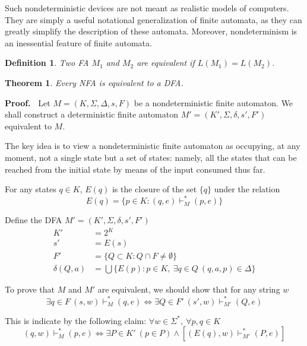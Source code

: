 \documentclass[aps,pra,onecolumn,notitlepage,superscriptaddress]{revtex4-1}
\def\y{\vdash}
\def\ys{\vdash^*}
\newtheorem{theo}{Theorem}
\newtheorem{defi}{Definition}
\def\Proof{{\bf Proof.~}}
\begin{document}
    Such nondeterministic devices are not meant as realistic models of computers. They are simply a useful notational generalization of finite automata, as they can greatly simplify the description of these automata. Moreover, nondeterminism is an inessential feature of finite automata.

    \begin{defi}
        Two FA $M_1$ and $M_2$ are equivalent if $L(M_1) = L(M_2)$. 
    \end{defi}

    \begin{theo}
        Every NFA is equivalent to a DFA.
    \end{theo}
    
    \Proof
    Let $M = (K, \Sigma, \Delta, s, F)$ be a nondeterministic finite automaton. We shall construct a deterministic finite automaton $M' = (K', \Sigma, \delta, s', F')$ equivalent to $M$. 
    
    The key idea is to view a nondeterministic finite automaton as occupying, at any moment, not a single state but a set of states: namely, all the states that can be reached from the initial state by means of the input consumed thus far.
    
    For any states $q \in K$, $E(q)$ is the closure of the set $\{q\}$ under the relation
    \begin{equation}
        E(q) = \{ p \in K : (q,e) \ys_M (p,e) \}
    \end{equation}

    Define the DFA $M' = (K', \Sigma, \delta, s', F')$
    \begin{align}
        K' &= 2^K \\
        s' &= E(s) \\
        F' &= \{ Q \subset K : Q \cap F \neq \emptyset \} \\
        \delta(Q,a) &= \bigcup \{ E(p) : p \in K, \ \exists q \in Q \ (q,a,p) \in \Delta \}
    \end{align}

    To prove that $M$ and $M'$ are equivalent, we should show that for any string $w$ 
    \begin{equation*}
        \exists q \in F \ (s,w) \y_{M}^* (q,e) \Longleftrightarrow \exists Q\in F'\ (s', w) \ys_{M'} (Q,e)
    \end{equation*}

    This is indicate by the following claim: $\forall w \in \Sigma^*, \ \forall p,q \in K$
    \begin{equation*}
        (q,w) \ys_M (p,e) \Longleftrightarrow \exists P \in K' \ (p \in P) \land 
        \left[
        (E(q), w) \ys_{M'} (P,e)
        \right]
    \end{equation*}
\end{document}

